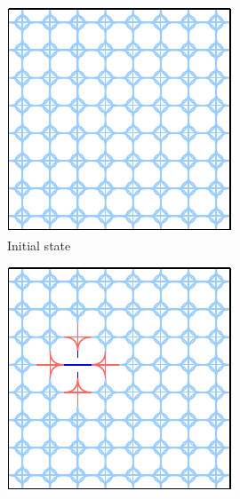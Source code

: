 \begin{figure}
    \begin{subfigure}{0.31\textwidth}
        \includegraphics[width=\linewidth]{img/WFC initial state.pdf}
        \caption{Initial state} \label{fig:wfc-initial}
    \end{subfigure}%
    \hspace*{\fill}
    \begin{subfigure}{0.31\textwidth}
        \includegraphics[width=\linewidth]{img/WFC step 1.pdf}

\end{subfigure}
\end{figure}
